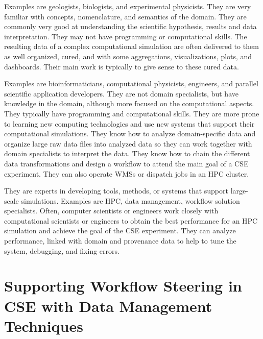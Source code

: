 
Examples are geologists, biologists, and
experimental physicists. They are very familiar with concepts,
nomenclature, and semantics of the domain. They are commonly very good
at understanding the scientific hypothesis, results and data
interpretation. They may not have programming or computational skills.
The resulting data of a complex computational simulation are often
delivered to them as well organized, cured, and with some aggregations,
visualizations, plots, and dashboards. Their main work is typically to
give sense to these cured data.


Examples are bioinformaticians,
computational physicists, engineers, and parallel scientific application
developers. They are not domain specialists, but have knowledge in the
domain, although more focused on the computational aspects.
They typically have programming and computational skills.
They are more prone to learning
new computing technologies and use new systems that support their
computational simulations.
They know how to analyze domain-specific data and organize large raw data files into analyzed data so
they can work together with domain specialists to interpret the
data.
They know how to chain the different data transformations and
design a workflow to attend the main goal of a CSE experiment.
They can also operate WMSs or dispatch jobs in an HPC cluster.


They are experts in developing tools,
methods, or systems that support large-scale simulations. Examples are
HPC, data management, workflow solution specialists.
Often, computer scientists or engineers work
closely with computational scientists or engineers to obtain the best performance for
an HPC simulation and achieve the goal of the CSE experiment.
They can analyze
performance, linked with domain and provenance data to help to tune
the system, debugging, and fixing errors.



\section{Supporting Workflow Steering in CSE with Data Management Techniques}
\label{section_workflow_steering_db}


